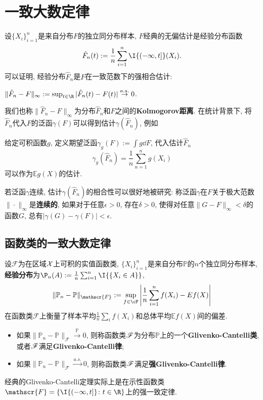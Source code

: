 \section{一致大数定律}
 
设$\{X_i\}_{i=1}^n$是来自分布$F$的独立同分布样本, $F$经典的无偏估计是经验分布函数
\begin{equation*}
	\hat F_n(t) := \frac{1}{n} \sum_{i=1}^n \I{(-\infty, t]}(X_i). 
\end{equation*}
可以证明, 经验分布$\hat F_n$是$F$在一致范数下的强相合估计: 
\begin{theorem}\label{thm:Glivenko-Cantelli}
	$\|\hat F_n - F\|_{\infty} := \sup_{t \in \R} |\hat F_n(t) - F(t)| \stackrel{a.s.}{\to} 0$. 
\end{theorem}
我们也称$\|\hat F_n - F\|_{\infty}$为分布$\hat F_n$和$F$之间的\textbf{Kolmogorov距离}. 
在统计背景下,  将$\hat F_n$代入$F$的泛函$\gamma(F)$可以得到估计$\gamma(\hat F_n)$, 例如

\begin{example}
	给定可积函数$g$, 定义期望泛函$\gamma_g(F) := \int g \dd F$, 代入估计$\hat F_n$
	\begin{equation*}
		\gamma_g(\hat F_n) = \frac{1}{n} \sum_{n=1}^n g(X_i)
	\end{equation*}
	可以作为$\mathbb{E} g(X)$的估计. 
\end{example}

若泛函$\gamma$连续, 估计$\gamma(\hat F_n)$的相合性可以很好地被研究: 称泛函$\gamma$在$F$关于极大范数$\| \cdot \|_{\infty}$是\textbf{连续的}, 如果对于任意$\epsilon > 0$, 存在$\delta > 0$, 使得对任意$\|G - F\|_{\infty} < \delta$的函数$G$, 总有$|\gamma(G) - \gamma(F)| < \epsilon$. 

\subsection{函数类的一致大数定律}

设$\mathscr{F}$为在区域$\mathcal{X}$上可积的实值函数类, $\{X_i\}_{i=1}^n$是来自分布$\mathbb{P}$的$n$个独立同分布样本, \textbf{经验分布}为$\P_n(A) := \frac{1}{n} \sum_{i=1}^n \I{\{X_i \in A\}}$, 
\begin{equation*}
	\|\mathbb{P}_n - \mathbb{P}\|_{\mathscr{F}} := \sup_{f \in\cF} \left| \frac{1}{n} \sum_{i=1}^n f(X_i) - E f(X) \right|
\end{equation*}
在函数类$\mathscr{F}$上衡量了样本平均$\frac{1}{n} \sum_i f(X_i)$和总体平均$\mathbb{E} f(X)$间的偏差. 
\begin{itemize}
	\item 如果$\|\mathbb{P}_n - \mathbb{P}\|_{\mathscr{F}} \stackrel{\mathbb{P}}{\to} 0$, 则称函数类$\mathscr{F}$为分布$\mathbb{P}$上的一个\textbf{Glivenko-Cantelli类}, 或者$\mathscr{F}$满足\textbf{Glivenko-Cantelli律}; 
	\item 如果$\|\mathbb{P}_n - \mathbb{P}\|_{\mathscr{F}} \stackrel{a.s.}{\to} 0$, 则称函数类$\mathscr{F}$满足\textbf{强Glivenko-Cantelli律}. 
\end{itemize}
经典的Glivenko-Cantelli定理实际上是在示性函数类$\mathscr{F} = \{\I{(- \infty, t]} \colon t \in \R \}$上的强一致定律. 


